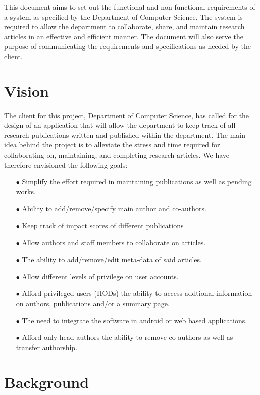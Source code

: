 \documentclass[a4paper,12pt]{article}
\begin{document}
This document aims to set out the functional and non-functional requirements of a system as specified by the Department of Computer Science. The system is required to allow the department to collaborate, share, and maintain research articles in an effective and efficient manner. The document will also serve the purpose of communicating the requirements and specifications as needed by the client.

\newpage
\section{Vision}

The client for this project, Department of Computer Science, has called for the design of an application that will allow the department to keep track of all research publications written and published within the department. The main idea behind the project is to alleviate the stress and time required for collaborating on, maintaining, and completing research articles. We have therefore envisioned the following goals:

	\begin{itemize}
		\item[$\bullet$] Simplify the effort required in maintaining publications as well as pending works.
		\item[$\bullet$] Ability to add/remove/specify main author and co-authors.
		\item[$\bullet$] Keep track of impact scores of different publications
		\item[$\bullet$] Allow authors and staff members to collaborate on articles.
		\item[$\bullet$] The ability to add/remove/edit meta-data of said articles.
		\item[$\bullet$] Allow different levels of privilege on user accounts.
		\item[$\bullet$] Afford privileged users (HODs) the ability to access addtional information on authors, publications and/or a summary page.  
		\item[$\bullet$] The need to integrate the software in android or web based applications.
		\item[$\bullet$] Afford only head authors the ability to remove co-authors as well as transfer authorship.
	\end{itemize}
	
\newpage
\section{Background}
\end{document}
